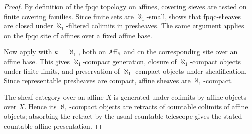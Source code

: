 \documentclass[11pt]{book}
\begin{document}
	\begin{proof}
		By definition of the fpqc topology on affines, covering sieves are
		tested on finite covering families. Since finite sets are
		$\aleph_1$-small, 
		shows that fpqc-sheaves are closed under $\aleph_1$-filtered colimits
		in presheaves. The same argument applies on the fpqc site of affines
		over a fixed affine base.

		Now apply  with
		$\kappa=\aleph_1$, both on $\operatorname{Aff}_{\operatorname{\mathbb S}}$ and on the corresponding site
		over an affine base. This gives $\aleph_1$-compact generation, closure
		of $\aleph_1$-compact objects under finite limits, and preservation of
		$\aleph_1$-compact objects under sheafification. Since representable
		presheaves are compact, affine sheaves are $\aleph_1$-compact.

		The sheaf category over an affine $X$ is generated under colimits by
		affine objects over $X$. Hence its $\aleph_1$-compact objects are
		retracts of countable colimits of affine objects; absorbing the retract
		by the usual countable telescope gives the stated countable affine
		presentation.
	\end{proof}
\end{document}
